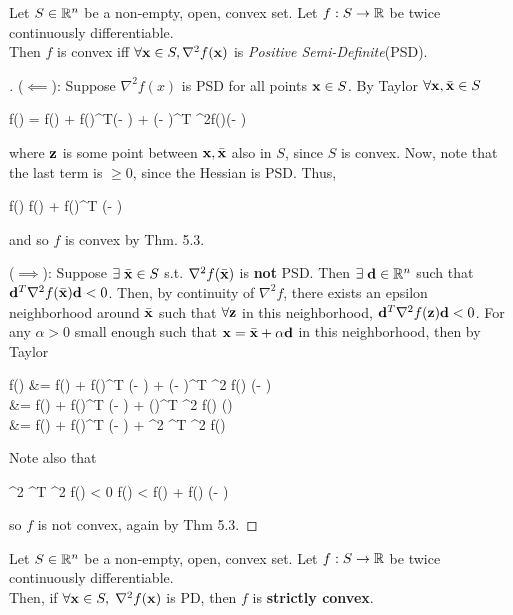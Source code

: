 \begin{theo}{}{}
Let $S \in \mathbb{R}^n$ be a non-empty, open, convex set. Let 
$f: S \rightarrow \mathbb{R}$ be twice continuously differentiable. 
\medskip\\
Then $f$ is convex iff 
$\forall \mathbf{x} \in S, \nabla^2 f(\mathbf{x})$ is \textit{Positive Semi-Definite}(PSD).
\end{theo}

\begin{proof}[]
($\impliedby$): Suppose $\nabla^2 f(x)$ is PSD for all points $\mathbf{x} \in S$.
By Taylor $\forall \mathbf{x}, \bar{\mathbf{x}} \in S$
\begin{frml}
	f(\vx) = f(\bx) + \nabla f(\bx)^T(\vx - \bx)
	+  (\vx - \bx)^T \nabla^2f(\vz)(\vx - \bx)
\end{frml}
where $\mathbf{z}$ is some point between $\mathbf{x}, \bar{\mathbf{x}}$ also in $S$, since $S$ is convex.
Now, note that the last term is $\geq 0$, since the Hessian is PSD.
Thus,
\begin{frml}
	f(\vx) \geq f(\bx) + \nabla f(\bx)^T (\vx - \bx)
\end{frml}
and so $f$ is convex by Thm. 5.3.

($\implies$): Suppose $\exists \; \bar{\mathbf{x}} \in S$ s.t. $\nabla^2 f(\bar{\mathbf{x}})$ is \textbf{not} PSD.
Then $\exists \; \mathbf{d} \in \mathbb{R}^n$ such that $\mathbf{d}^T \nabla^2 f(\bar{\mathbf{x}}) \mathbf{d} < 0$.
Then, by continuity of $\nabla^2 f$, there exists an epsilon neighborhood around 
$\bar{\mathbf{x}}$ such that $\forall \mathbf{z}$ in this neighborhood, $\mathbf{d}^T \nabla^2 f(\mathbf{z}) \mathbf{d} < 0$.
For any $\alpha > 0$ small enough such that $\mathbf{x} = \bar{\mathbf{x}} + \alpha \mathbf{d}$ in this
neighborhood, then by Taylor
\begin{frml}
	f(\vx) &= f(\bx) + \nabla f(\bx)^T (\vx - \bx) + (\vx - \bx)^T
	\nabla^2 f(\vz) (\vx - \bx) \\
		   &= f(\bx) + \nabla f(\bx)^T (\vx - \bx) + (\alpha \vd)^T
	\nabla^2 f(\vz) (\alpha \vd) \\
		   &= f(\bx) + \nabla f(\bx)^T (\vx - \bx) + \alpha^2 \vd^T
	\nabla^2 f(\vz) \vd \\
\end{frml}

Note also that

\begin{frml}
	\alpha^2 \vd^T \nabla^2 f(\vz) \vd < 0 
	\implies f(\vx) < f(\bx) + \nabla f(\bx) (\vx - \bx)
\end{frml}
so $f$ is not convex, again by Thm 5.3.
\end{proof}

\begin{theo}{}{}
Let $S \in \mathbb{R}^n$ be a non-empty, open, convex set. Let 
$f: S \rightarrow \mathbb{R}$ be twice continuously differentiable.
\medskip\\
Then, if $\forall \mathbf{x} \in S, \; \nabla^2 f(\mathbf{x})$ is PD, then $f$ is 
\textbf{strictly convex}.
\end{theo}

